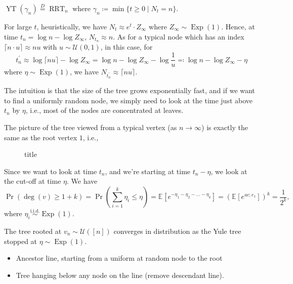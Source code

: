 \begin{lemma}
	\(\operatorname{YT}(\gamma _n) \overset{D}{=} \operatorname{RRT}_n \) where \(\gamma _n \coloneqq \min \{ t \geq 0 \mid N_t = n \} \).
\end{lemma}

For large \(t\), heuristically, we have \(N_t \approx e^t \cdot Z_{\infty } \) where \(Z_{\infty } \sim \operatorname{Exp}(1) \). Hence, at time \(t_n = \log n - \log Z_{\infty }\), \(N_{t_n} \approx n\). As for a typical node which has an index \(\lceil n \cdot u \rceil \approx n u\) with \(u \sim \mathcal{U} (0, 1)\), in this case, for
\[
	t^{\prime} _n
	\approx \log \lceil n u \rceil - \log Z_{\infty }
	= \log n - \log Z_\infty - \log \frac{1}{u}
	\eqqcolon \log n - \log Z_\infty - \eta
\]
where \(\eta \sim \operatorname{Exp}(1) \), we have \(N_{t^{\prime} _n} \approx \lceil n u \rceil \).

\begin{intuition}
	The intuition is that the size of the tree grows exponentially fast, and if we want to find a uniformly random node, we simply need to look at the time just above \(t_n\) by \(\eta \), i.e., most of the nodes are concentrated at leaves.
\end{intuition}

The picture of the tree viewed from a typical vertex (as \(n \to \infty \)) is exactly the same as the root vertex \(1\), i.e.,
\begin{figure}[H]
	\centering
	\caption{title}
	\label{fig:CTBP-typical-vertex}
\end{figure}

Since we want to look at time \(t_n\), and we're starting at time \(t_n - \eta \), we look at the cut-off at time \(\eta \). We have
\[
	\Pr_{}\left(\deg (v) \geq 1 + k\right)
	= \Pr_{}\left(\sum_{i=1}^{k} \eta _i \leq \eta \right)
	= \mathbb{E}_{}[e^{- \eta _1 - \eta _2 - \dots - \eta _k}]
	= \left( \mathbb{E}_{}[e^{ac;e_1} ] \right) ^k
	= \frac{1}{2^k},
\]
where \(\eta _i \overset{\text{i.i.d.} }{\sim } \operatorname{Exp}(1) \).

\begin{theorem}
	The tree rooted at \(v_n \sim \mathcal{U} ([n])\) converges in distribution as the Yule tree stopped at \(\eta \sim \operatorname{Exp}(1) \).
\end{theorem}

\begin{figure}[H]
	\centering
	\caption{}
	\label{fig:CTBP-ancestor}
\end{figure}

\begin{itemize}
	\item Ancestor line, starting from a uniform at random node to the root
	\item Tree hanging below any node on the line (remove descendant line).
\end{itemize}

